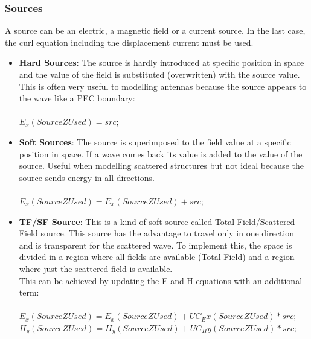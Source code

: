 \subsubsection{Sources}
A source can be an electric, a magnetic field or a current source. In the last case, the curl equation including the displacement current must be used.
\begin{itemize}
	\item \textbf{Hard Sources}: The source is hardly introduced at specific position in space and the value of the field is substituted (overwritten) with the source value. This is often very useful to modelling antennas because the source appears to the wave like a PEC boundary:\\ \\
	$E_x(SourceZUsed) = src;$
	\\
	\item \textbf{Soft Sources}: The source is superimposed to the field value at a specific position in space. If a wave comes back its value is added to the value of the source. Useful when modelling scattered structures but not ideal because the source sends energy in all directions.\\ \\
	$E_x(SourceZUsed) = E_x(SourceZUsed)+src;$\\
	\item \textbf{TF/SF Source}: This is a kind of soft source called Total Field/Scattered Field source.
	This source has the advantage to travel only in one direction and is transparent for the scattered wave. To implement this, the space is divided in a region where all fields are available (Total Field) and a region where just the scattered field is available.\\This can be achieved by updating the E and H-equations with an additional term:\\ \\
	$E_x(SourceZUsed) = E_x(SourceZUsed)+UC_Ex(SourceZUsed)*src;$\\
	$H_y(SourceZUsed) = H_y(SourceZUsed)+UC_Hy(SourceZUsed)*src;$\\
\end{itemize}

